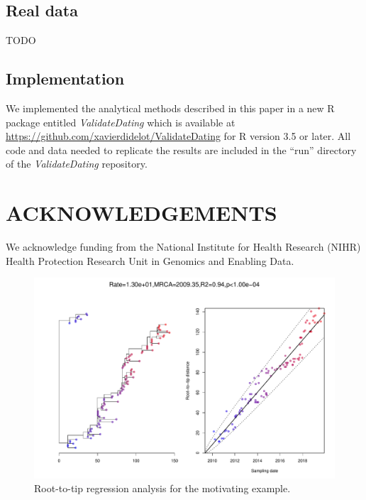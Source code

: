\documentclass{article}
\begin{document}
\subsection*{Real data}

TODO

\subsection*{Implementation}

We implemented the analytical methods described in this paper in a 
new R package entitled \emph{ValidateDating} which is available
at \url{https://github.com/xavierdidelot/ValidateDating} for R version 3.5 or later. 
All code and data needed to replicate the results are included in the ``run'' directory of the \emph{ValidateDating} repository.

\section*{ACKNOWLEDGEMENTS}

We acknowledge funding from the National Institute for Health Research (NIHR) Health Protection Research Unit in Genomics and Enabling Data.

\newpage


%

\newpage
\setcounter{figure}{0}
\setcounter{table}{0}
\makeatletter 
\renewcommand{\thefigure}{S\@arabic\c@figure} 
\renewcommand{\thetable}{S\@arabic\c@table} 
\makeatother

\begin{figure}[t!]
\begin{center}
\includegraphics[width=15cm]{exampleS1.pdf}
\end{center}
\caption{Root-to-tip regression analysis for the motivating example.
\label{fig:exampleS1}}
\end{figure}
\end{document}
